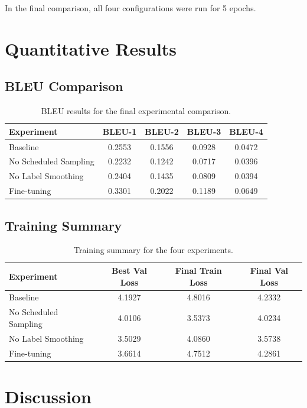 \documentclass[11pt,a4paper]{article}
\begin{document}
In the final comparison, all four configurations were run for 5 epochs.

\section{Quantitative Results}

\subsection{BLEU Comparison}

\begin{table}[H]
\centering
\caption{BLEU results for the final experimental comparison.}
\begin{tabular}{lcccc}
\toprule
Experiment & BLEU-1 & BLEU-2 & BLEU-3 & BLEU-4 \\
\midrule
Baseline & 0.2553 & 0.1556 & 0.0928 & 0.0472 \\
No Scheduled Sampling & 0.2232 & 0.1242 & 0.0717 & 0.0396 \\
No Label Smoothing & 0.2404 & 0.1435 & 0.0809 & 0.0394 \\
Fine-tuning & 0.3301 & 0.2022 & 0.1189 & 0.0649 \\
\bottomrule
\end{tabular}
\end{table}

\subsection{Training Summary}

\begin{table}[H]
\centering
\caption{Training summary for the four experiments.}
\begin{tabular}{lccc}
\toprule
Experiment & Best Val Loss & Final Train Loss & Final Val Loss \\
\midrule
Baseline & 4.1927 & 4.8016 & 4.2332 \\
No Scheduled Sampling & 4.0106 & 3.5373 & 4.0234 \\
No Label Smoothing & 3.5029 & 4.0860 & 3.5738 \\
Fine-tuning & 3.6614 & 4.7512 & 4.2861 \\
\bottomrule
\end{tabular}
\end{table}

\section{Discussion}
\end{document}
